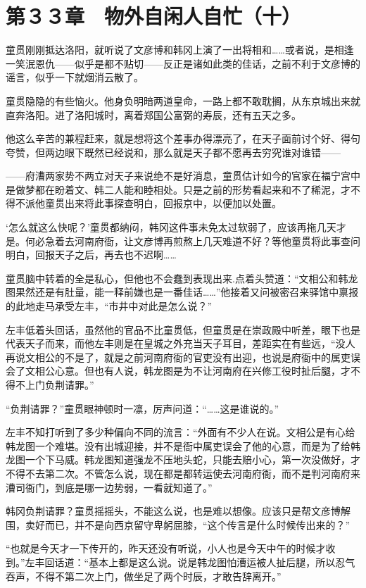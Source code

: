\section{第３３章　物外自闲人自忙（十）}

童贯刚刚抵达洛阳，就听说了文彦博和韩冈上演了一出将相和……或者说，是相逢一笑泯恩仇——似乎是都不贴切——反正是诸如此类的佳话，之前不利于文彦博的谣言，似乎一下就烟消云散了。

童贯隐隐的有些恼火。他身负明暗两道皇命，一路上都不敢耽搁，从东京城出来就直奔洛阳。进了洛阳城时，离着郑国公富弼的寿辰，还有五天之多。

他这么辛苦的兼程赶来，就是想将这个差事办得漂亮了，在天子面前讨个好、得句夸赞，但两边眼下既然已经说和，那么就是天子都不愿再去穷究谁对谁错——

——府漕两家势不两立对天子来说绝不是好消息，童贯估计如今的官家在福宁宫中是做梦都在盼着文、韩二人能和睦相处。只是之前的形势看起来和不了稀泥，才不得不派他童贯出来将此事探查明白，回报京中，以便加以处置。

‘怎么就这么快呢？’童贯都纳闷，韩冈这件事未免太过软弱了，应该再拖几天才是。何必急着去河南府衙，让文彦博再煎熬上几天难道不好？等他童贯将此事查问明白，回报天子之后，再去也不迟啊……

童贯脑中转着的全是私心，但他也不会蠢到表现出来.点着头赞道：“文相公和韩龙图果然还是有肚量，能一释前嫌也是一番佳话……”他接着又问被密召来驿馆中禀报的此地走马承受左丰，“市井中对此是怎么说？”

左丰低着头回话，虽然他的官品不比童贯低，但童贯是在崇政殿中听差，眼下也是代表天子而来，而他左丰则是在皇城之外充当天子耳目，差距实在有些远，“没人再说文相公的不是了，就是之前河南府衙的官吏没有出迎，也说是府衙中的属吏误会了文相公心意。但也有人说，韩龙图是为不让河南府在兴修工役时扯后腿，才不得不上门负荆请罪。”

“负荆请罪？”童贯眼神顿时一凛，厉声问道：“……这是谁说的。”

左丰不知打听到了多少种偏向不同的流言：“外面有不少人在说。文相公是有心给韩龙图一个难堪。没有出城迎接，并不是衙中属吏误会了他的心意，而是为了给韩龙图一个下马威。韩龙图知道强龙不压地头蛇，只能去赔小心，第一次没做好，才不得不去第二次。不管怎么说，现在都是都转运使去河南府衙，而不是判河南府来漕司衙门，到底是哪一边势弱，一看就知道了。”

韩冈负荆请罪？童贯摇摇头，不能这么说，也是难以想像。应该只是帮文彦博解围，卖好而已，并不是向西京留守卑躬屈膝，“这个传言是什么时候传出来的？”

“也就是今天才一下传开的，昨天还没有听说，小人也是今天中午的时候才收到。”左丰回话道：“基本上都是这么说。说是韩龙图怕漕运被人扯后腿，所以忍气吞声，不得不第二次上门，做坐足了两个时辰，才敢告辞离开。”

